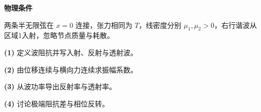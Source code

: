 \textbf{物理条件}\par 两条半无限弦在 \(x=0\) 连接，张力相同为 \(T\)，线密度分别 \(\mu_1,\mu_2>0\)，右行谐波从区域1入射，忽略节点质量与耗散。
\par\noindent\textbf{(1)} 定义波阻抗并写入射、反射与透射波。
\par\noindent\textbf{(2)} 由位移连续与横向力连续求振幅系数。
\par\noindent\textbf{(3)} 从波功率导出反射率与透射率。
\par\noindent\textbf{(4)} 讨论极端阻抗差与相位反转。
